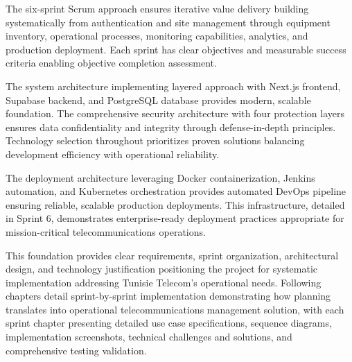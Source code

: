 The six-sprint Scrum approach ensures iterative value delivery building systematically from authentication and site management through equipment inventory, operational processes, monitoring capabilities, analytics, and production deployment. Each sprint has clear objectives and measurable success criteria enabling objective completion assessment.

The system architecture implementing layered approach with Next.js frontend, Supabase backend, and PostgreSQL database provides modern, scalable foundation. The comprehensive security architecture with four protection layers ensures data confidentiality and integrity through defense-in-depth principles. Technology selection throughout prioritizes proven solutions balancing development efficiency with operational reliability.

The deployment architecture leveraging Docker containerization, Jenkins automation, and Kubernetes orchestration provides automated DevOps pipeline ensuring reliable, scalable production deployments. This infrastructure, detailed in Sprint 6, demonstrates enterprise-ready deployment practices appropriate for mission-critical telecommunications operations.

This foundation provides clear requirements, sprint organization, architectural design, and technology justification positioning the project for systematic implementation addressing Tunisie Telecom's operational needs. Following chapters detail sprint-by-sprint implementation demonstrating how planning translates into operational telecommunications management solution, with each sprint chapter presenting detailed use case specifications, sequence diagrams, implementation screenshots, technical challenges and solutions, and comprehensive testing validation.